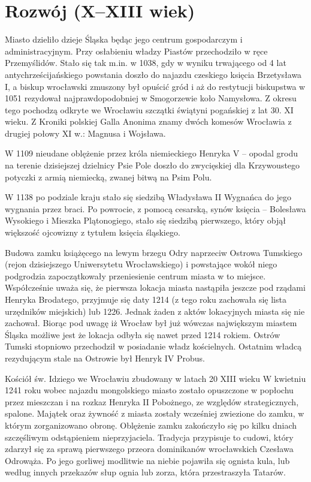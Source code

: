 \documentclass{article}
\begin{document}
 \section{Rozwój (X–XIII wiek)}
 Miasto dzieliło dzieje Śląska będąc jego centrum gospodarczym i administracyjnym. Przy osłabieniu władzy Piastów przechodziło w ręce Przemyślidów. Stało się tak m.in. w 1038, gdy w wyniku trwającego od 4 lat antychrześcijańskiego powstania doszło do najazdu czeskiego księcia Brzetysława I, a biskup wrocławski zmuszony był opuścić gród i aż do restytucji biskupstwa w 1051 rezydował najprawdopodobniej w Smogorzewie koło Namysłowa. Z okresu tego pochodzą odkryte we Wrocławiu szczątki świątyni pogańskiej z lat 30. XI wieku. Z Kroniki polskiej Galla Anonima znamy dwóch komesów Wrocławia z drugiej połowy XI w.: Magnusa i Wojsława.

W 1109 nieudane oblężenie przez króla niemieckiego Henryka V – opodal grodu na terenie dzisiejszej dzielnicy Psie Pole doszło do zwycięskiej dla Krzywoustego potyczki z armią niemiecką, zwanej bitwą na Psim Polu.

W 1138 po podziale kraju stało się siedzibą Władysława II Wygnańca do jego wygnania przez braci. Po powrocie, z pomocą cesarską, synów księcia – Bolesława Wysokiego i Mieszka Plątonogiego, stało się siedzibą pierwszego, który objął większość ojcowizny z tytułem księcia śląskiego.

Budowa zamku książęcego na lewym brzegu Odry naprzeciw Ostrowa Tumskiego (rejon dzisiejszego Uniwersytetu Wrocławskiego) i powstające wokół niego podgrodzia zapoczątkowały przeniesienie centrum miasta w to miejsce. Współcześnie uważa się, że pierwsza lokacja miasta nastąpiła jeszcze pod rządami Henryka Brodatego, przyjmuje się daty 1214 (z tego roku zachowała się lista urzędników miejskich) lub 1226. Jednak żaden z aktów lokacyjnych miasta się nie zachował. Biorąc pod uwagę iż Wrocław był już wówczas największym miastem Śląska możliwe jest że lokacja odbyła się nawet przed 1214 rokiem. Ostrów Tumski stopniowo przechodził w posiadanie władz kościelnych. Ostatnim władcą rezydującym stale na Ostrowie był Henryk IV Probus.

Kościół św. Idziego we Wrocławiu zbudowany w latach 20 XIII wieku
W kwietniu 1241 roku wobec najazdu mongolskiego miasto zostało opuszczone w popłochu przez mieszczan i na rozkaz Henryka II Pobożnego, ze względów strategicznych, spalone. Majątek oraz żywność z miasta zostały wcześniej zwiezione do zamku, w którym zorganizowano obronę. Oblężenie zamku zakończyło się po kilku dniach szczęśliwym odstąpieniem nieprzyjaciela. Tradycja przypisuje to cudowi, który zdarzył się za sprawą pierwszego przeora dominikanów wrocławskich Czesława Odrowąża. Po jego gorliwej modlitwie na niebie pojawiła się ognista kula, lub według innych przekazów słup ognia lub zorza, która przestraszyła Tatarów.
\end{document}
